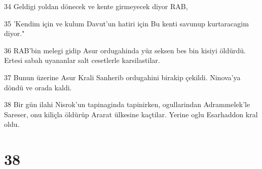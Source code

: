 \par 34 Geldigi yoldan dönecek ve kente girmeyecek diyor RAB,
\par 35 'Kendim için ve kulum Davut'un hatiri için Bu kenti savunup kurtaracagim diyor."
\par 36 RAB'bin melegi gidip Asur ordugahinda yüz seksen bes bin kisiyi öldürdü. Ertesi sabah uyananlar salt cesetlerle karsilastilar.
\par 37 Bunun üzerine Asur Krali Sanherib ordugahini birakip çekildi. Ninova'ya döndü ve orada kaldi.
\par 38 Bir gün ilahi Nisrok'un tapinaginda tapinirken, ogullarindan Adrammelek'le Sareser, onu kiliçla öldürüp Ararat ülkesine kaçtilar. Yerine oglu Esarhaddon kral oldu.

\chapter{38}

